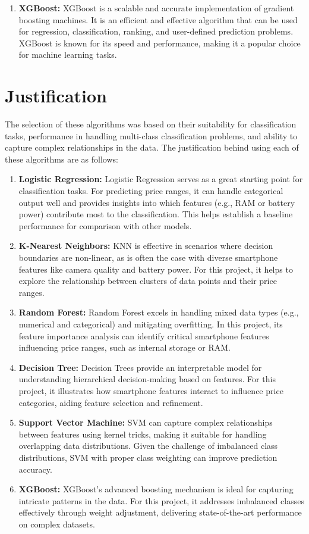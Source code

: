 \documentclass[12pt]{report}
\begin{document}
\begin{enumerate}
	\item{\textbf{XGBoost: }}XGBoost is a scalable and accurate implementation of gradient boosting machines. It is an efficient and effective algorithm that can be used for regression, classification, ranking, and user-defined prediction problems. XGBoost is known for its speed and performance, making it a popular choice for machine learning tasks. \cite{hadsonml}
\end{enumerate}

\section{Justification}
The selection of these algorithms was based on their suitability for classification tasks, performance in handling multi-class classification problems, and ability to capture complex relationships in the data. The justification behind using each of these algorithms are as follows:
\vspace{-1.25em}
\begin{enumerate}
	\setlength\itemsep{-1.05em}
	\item{\textbf{Logistic Regression: }}Logistic Regression serves as a great starting point for classification tasks. For predicting price ranges, it can handle categorical output well and provides insights into which features (e.g., RAM or battery power) contribute most to the classification. This helps establish a baseline performance for comparison with other models.
	\item{\textbf{K-Nearest Neighbors: }}KNN is effective in scenarios where decision boundaries are non-linear, as is often the case with diverse smartphone features like camera quality and battery power. For this project, it helps to explore the relationship between clusters of data points and their price ranges.
	\item{\textbf{Random Forest: }}Random Forest excels in handling mixed data types (e.g., numerical and categorical) and mitigating overfitting. In this project, its feature importance analysis can identify critical smartphone features influencing price ranges, such as internal storage or RAM.
	\item{\textbf{Decision Tree: }}Decision Trees provide an interpretable model for understanding hierarchical decision-making based on features. For this project, it illustrates how smartphone features interact to influence price categories, aiding feature selection and refinement.
	\item{\textbf{Support Vector Machine: }}SVM can capture complex relationships between features using kernel tricks, making it suitable for handling overlapping data distributions. Given the challenge of imbalanced class distributions, SVM with proper class weighting can improve prediction accuracy.
	\item{\textbf{XGBoost: }}XGBoost’s advanced boosting mechanism is ideal for capturing intricate patterns in the data. For this project, it addresses imbalanced classes effectively through weight adjustment, delivering state-of-the-art performance on complex datasets.
\end{enumerate}
\end{document}
